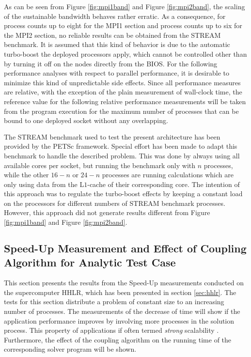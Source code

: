 As can be seen from Figure \ref{fig:mpi1band} and Figure \ref{fig:mpi2band}, the scaling of the sustainable bandwidth behaves rather erratic. As a consequence, for process counts up to eight for the MPI1 section and process counts up to six for the MPI2 section, no reliable results can be obtained from the STREAM benchmark. It is assumed that this kind of behavior is due to the automatic turbo-boost the deployed processors apply, which cannot be controlled other than by turning it off on the nodes directly from the BIOS. For the following performance analyses with respect to parallel performance, it is desirable to minimize this kind of unpredictable side effects. Since all performance measures are relative, with the exception of the plain measurement of wall-clock time, the reference value for the following relative performance measurements will be taken from the program execution for the maximum number of processes that can be bound to one deployed socket without any overlapping.

The STREAM benchmark used to test the present architecture has been provided by the PETSc framework. Special effort has been made to adapt this benchmark to handle the described problem. This was done by always using all available cores per socket, but running the benchmark only with \(n\) processes, while the other \(16 - n\) or \(24 - n\) processes are running calculations which are only using data from the L\(1\)-cache of their corresponding core. The intention of this approach was to regulate the turbo-boost effects by keeping a constant load on the processors for different numbers of STREAM benchmark processes. However, this approach did not generate results different from Figure \ref{fig:mpi1band} and Figure \ref{fig:mpi2band}.

\subsection{Speed-Up Measurement and Effect of Coupling Algorithm for Analytic Test Case}
\label{sec:speedup}

This section presents the results from the Speed-Up measurements conducted on the supercomputer HHLR, which has been presented in section \ref{sec:hhlr}. The tests for this section distribute a problem of constant size to an increasing number of processes. The measurements of the decrease of time will show if the application performance improves by involving more processes in the solution process. This property of applications if often termed \emph{strong} scalability \cite{hager11}. Furthermore, the effect of the coupling algorithm on the running time of the corresponding solver program will be shown. 

